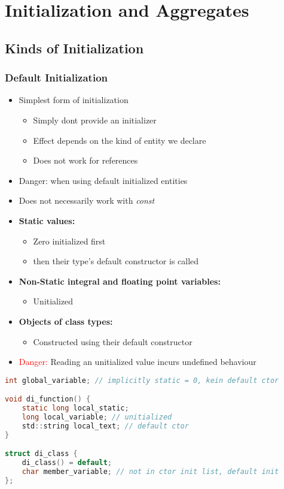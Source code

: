 
\section{Initialization and Aggregates}

\subsection{Kinds of Initialization}
\subsubsection{Default Initialization}
\begin{itemize}
    \item Simplest form of initialization
    \begin{itemize}
        \item Simply dont provide an initializer
        \item Effect depends on the kind of entity we declare
        \item Does not work for references
    \end{itemize}
    \item Danger: when using default initialized entities
    \item Does not necessarily work with \textit{const}
    \item \textbf{Static values:}
    \begin{itemize}
        \item Zero initialized first
        \item then their type's default constructor is called
    \end{itemize}
    \item \textbf{Non-Static integral and floating point variables:}
    \begin{itemize}
        \item Unitialized
    \end{itemize}
    \item \textbf{Objects of class types:}
    \begin{itemize}
        \item Constructed using their default constructor
    \end{itemize}
    \item \textcolor{red}{Danger:} Reading an unitialized value incurs undefined behaviour
\end{itemize}
\begin{lstlisting}[style=frame, style= linenumbers, language=C]
int global_variable; // implicitly static = 0, kein default ctor

void di_function() {
    static long local_static;
    long local_variable; // unitialized
    std::string local_text; // default ctor
}

struct di_class {
    di_class() = default;
    char member_variable; // not in ctor init list, default init
};
\end{lstlisting}

